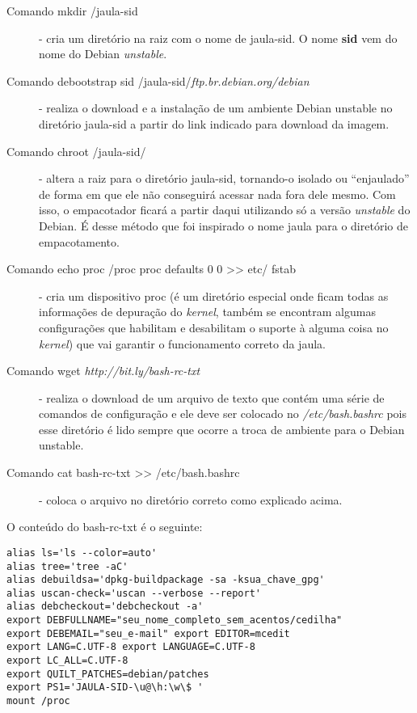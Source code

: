 \begin{description}

	\item[Comando mkdir /jaula-sid] - cria um diretório na raiz com o nome de jaula-sid. O nome \textbf{sid} vem do nome do Debian \textit{unstable}.
	\item[Comando debootstrap sid /jaula-sid/\textit{ftp.br.debian.org/debian}] - realiza o download e a instalação de um ambiente Debian unstable no diretório jaula-sid a partir do link indicado para download da imagem.
	\item[Comando chroot /jaula-sid/] - altera a raiz para o diretório jaula-sid, tornando-o isolado ou ``enjaulado'' de forma em que ele não conseguirá acessar nada fora dele mesmo. Com isso, o empacotador ficará a partir daqui utilizando só a versão \textit{unstable} do Debian. É desse método que foi inspirado o nome jaula para o diretório de empacotamento.
	\item[Comando echo proc /proc proc defaults 0 0 >> etc/ fstab] - cria um dispositivo proc (é um diretório especial onde ficam todas as informações de depuração do \textit{kernel}, também se encontram algumas configurações que habilitam e desabilitam o suporte à alguma coisa no \textit{kernel}) que vai garantir o funcionamento correto da jaula.
	\item[Comando wget \textit{http://bit.ly/bash-rc-txt}] - realiza o download de um arquivo de texto que contém uma série de comandos de configuração e ele deve ser colocado no \textit{/etc/bash.bashrc} pois esse diretório é lido sempre que ocorre a troca de ambiente para o Debian unstable.
	\item[Comando cat bash-rc-txt >> /etc/bash.bashrc] - coloca o arquivo no diretório correto como explicado acima.

\end{description}

O conteúdo do bash-rc-txt é o seguinte:
\begin{verbatim}
alias ls='ls --color=auto' 
alias tree='tree -aC' 
alias debuildsa='dpkg-buildpackage -sa -ksua_chave_gpg' 
alias uscan-check='uscan --verbose --report' 
alias debcheckout='debcheckout -a' 
export DEBFULLNAME="seu_nome_completo_sem_acentos/cedilha" 
export DEBEMAIL="seu_e-mail" export EDITOR=mcedit 
export LANG=C.UTF-8 export LANGUAGE=C.UTF-8 
export LC_ALL=C.UTF-8 
export QUILT_PATCHES=debian/patches 
export PS1='JAULA-SID-\u@\h:\w\$ ' 
mount /proc 
\end{verbatim}

